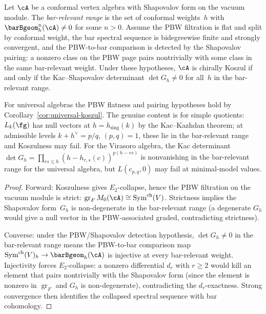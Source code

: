 \begin{theorem}
\label{thm:kac-shapovalov-koszulness}

Let $\cA$ be a conformal vertex algebra with Shapovalov form on the
vacuum module. The \emph{bar-relevant range} is the set of conformal
weights~$h$ with $\barBgeom^n_h(\cA) \neq 0$ for some $n > 0$.
Assume the PBW filtration is flat and split by conformal weight, the
bar spectral sequence is bidegreewise finite and strongly convergent,
and the PBW-to-bar comparison is detected by the Shapovalov pairing:
a nonzero class on the PBW page pairs nontrivially with some class in
the same bar-relevant weight. Under these hypotheses, $\cA$ is chirally
Koszul if and only if the Kac--Shapovalov determinant
$\det G_h \neq 0$ for all~$h$ in the bar-relevant range.

For universal algebras the PBW flatness and pairing hypotheses hold
by Corollary~\ref{cor:universal-koszul}. The genuine content is for
simple quotients: $L_k(\fg)$ has null vectors at
$h = h_{\mathrm{sing}}(k)$ by the Kac--Kazhdan theorem; at admissible
levels $k + h^\vee = p/q$, $(p,q)=1$, these lie in the bar-relevant
range and Koszulness may fail. For the Virasoro algebra, the Kac
determinant $\det G_h = \prod_{rs \leq h}(h - h_{r,s}(c))^{p(h-rs)}$
is nonvanishing in the bar-relevant range for the universal algebra,
but $L(c_{p,q}, 0)$ may fail at minimal-model values.
\end{theorem}

\begin{proof}
Forward: Koszulness gives $E_2$-collapse, hence the PBW
filtration on the vacuum module is strict:
$\operatorname{gr}_F M_0(\cA) \cong
\operatorname{Sym}^{\mathrm{ch}}(V)$. Strictness implies the
Shapovalov form~$G_h$ is non-degenerate in the bar-relevant
range (a degenerate $G_h$ would give a null vector in the
PBW-associated graded, contradicting strictness).

Converse: under the PBW/Shapovalov detection hypothesis,
$\det G_h \neq 0$ in the bar-relevant range means the
PBW-to-bar comparison map
$\operatorname{Sym}^{\mathrm{ch}}(V)_h \to \barBgeom_h(\cA)$ is
injective at every bar-relevant weight. Injectivity forces
$E_2$-collapse: a nonzero differential $d_r$ with $r \geq 2$ would
kill an element that pairs nontrivially with the Shapovalov form
(since the element is nonzero in $\operatorname{gr}_F$ and $G_h$ is
non-degenerate), contradicting the $d_r$-exactness. Strong convergence
then identifies the collapsed spectral sequence with bar cohomology.
\end{proof}

